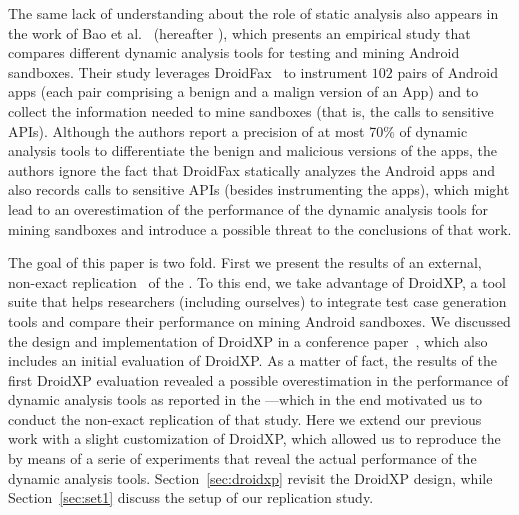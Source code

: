 The same lack of understanding about the role of static analysis also appears in the work of Bao et al.~\cite{DBLP:conf/wcre/BaoLL18} (hereafter \blls), which presents an empirical study that compares different dynamic analysis tools for testing and mining Android sandboxes. Their study leverages DroidFax~\cite{DBLP:conf/icsm/CaiR17a} to instrument $102$ pairs of Android apps (each pair comprising a benign and a malign version of an App) and to collect the information needed to mine sandboxes (that is, the calls to sensitive APIs).
Although the authors report a precision of at most 70\% of dynamic analysis tools to differentiate the benign and malicious versions of the apps, the authors ignore the fact that DroidFax statically analyzes the Android apps and also records calls to sensitive APIs (besides instrumenting the apps), which might lead to an overestimation of the performance of the dynamic analysis tools for mining sandboxes and introduce a possible threat to the conclusions of that work.

The goal of this paper is two fold. First we present the results of an
external, non-exact replication~\cite{role-of-replication} of the \blls. To this end,
we take advantage of DroidXP, a tool suite that helps researchers (including ourselves) to
integrate test case generation tools and compare their performance on
mining Android sandboxes. We discussed the design and implementation of DroidXP in a conference
paper~\cite{DBLP:conf/scam/CostaMCMVBC20}, which also
includes an initial evaluation of DroidXP.
As a matter of fact, the results of the first DroidXP evaluation revealed a possible
overestimation in the performance of dynamic analysis tools as
reported in the \blls---which in the end motivated us to
conduct the non-exact replication of that study. Here we extend
our previous work with a slight customization of DroidXP, which allowed us
to reproduce the \blls by means of a serie of experiments
that reveal the actual performance of the
dynamic analysis tools. Section~\ref{sec:droidxp} revisit the
DroidXP design, while Section~\ref{sec:set1} discuss
the setup of our replication study.


